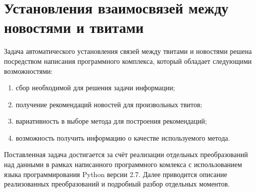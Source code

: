 \section{Установления взаимосвязей между новостями и твитами}
    Задача автоматического установления связей между твитами и новостями решена посредством написания программного комплекса,
    который обладает следующими возможностями:
    \begin{enumerate}
        \item сбор необходимой для решения задачи информации;
        \item получение рекомендаций новостей для произвольных твитов;
        \item вариативность в выборе метода для построения рекомендаций;
        \item возможность получить информацию о качестве используемого метода.
    \end{enumerate}
    Поставленная задача достигается за счёт реализации отдельных преобразований над данными в рамках написанного программного комлекса
    с использованием языка программирования Python версии 2.7.
    Далее приводится описание реализованных преобразований и подробный разбор отдельных моментов.


    
    
    
    
    

